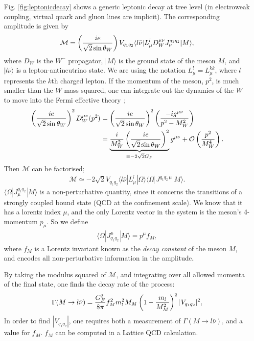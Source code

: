Fig. \ref{fig:leptonicdecay} shows a generic leptonic decay at tree level (in electroweak coupling, virtual quark and gluon lines are implicit). The corresponding amplitude is given by
\begin{align}
\mathcal{M} = \left({ie\over \sqrt{2}\sin\theta_W}\right) V_{q_1q_2} \langle l\bar{\nu} | L^l_{\mu} D_W^{\mu\nu} J_{\nu}^{q_1q_2} | M \rangle,
\end{align}
where $D_{W}$ is the $W^-$ propagator, $|M\rangle$ is the ground state of the meson $M$, and $|l\bar{\nu}\rangle$ is a lepton-antineutrino state. We are using the notation $L^l_{\mu}=L^{kk}_{\mu}$, where $l$ represents the $k$th charged lepton. If the momentum of the meson, $p^2$, is much smaller than the $W$ mass squared, one can integrate out the dynamics of the $W$ to move into the Fermi effective theory \cite{Borasoy:2007yi};
\begin{align}
  \nonumber
 \left({ie\over\sqrt{2}\sin\theta_W}\right)^2 D^{\mu\nu}_W(p^2) &= \left({ie\over\sqrt{2}\sin\theta_W}\right)^2 \left( -ig^{\mu\nu} \over p^2 - M_W^2 \right)
 \\ & = \underbrace{ {i\over M_W^2} \left( ie \over \sqrt{2}\sin\theta_W \right)^2  }_{\equiv -2\sqrt{2}G_F} g^{\mu\nu} + \mathcal{O}\left({p^2\over M_W^4}\right).
\end{align}
Then $\mathcal{M}$ can be factorised;
\begin{align}
  \mathcal{M} \simeq -2\sqrt{2} V_{q_1q_2} \langle l\bar{\nu} | L_{\mu}^l | \Omega \rangle \langle \Omega | J^{q_1q_2\, \mu} | M \rangle.
\end{align}
$\langle \Omega | J^{q_1q_2}_{\mu}| M \rangle$ is a non-perturbative quantity, since it concerns the transitions of a strongly coupled bound state (QCD at the confinement scale). We know that it has a lorentz index $\mu$, and the only Lorentz vector in the system is the meson's 4-momentum $p_{\mu}$. So we define
\begin{align}
  \langle\Omega | J_{q_1q_2}^{\mu} | M \rangle = p^{\mu} f_M,
\end{align}
where $f_M$ is a Lorentz invariant known as the {\it{decay constant}} of the meson $M$, and encodes all non-perturbative information in the amplitude.

By taking the modulus squared of $\mathcal{M}$, and integrating over all allowed momenta of the final state, one finds the decay rate of the process:
\begin{align}
  \Gamma(M\to l\bar{\nu}) = {G_F^2\over 8\pi} f_M^2 m_l^2 M_M \left( 1 - {m_l\over M_M^2} \right)^2 |V_{q_1q_2}|^2,
\end{align}
In order to find $|V_{q_1q_2}|$, one requires both a measurement of $\Gamma(M\to l\bar{\nu})$, and a value for $f_M$. $f_M$ can be computed in a Lattice QCD calculation.


